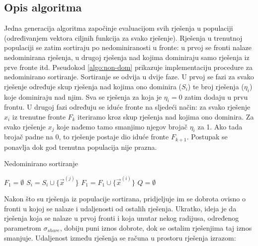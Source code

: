 \documentclass[times, utf8, zavrsni, numeric]{fer}
\begin{document}
\subsection{Opis algoritma}
Jedna generacija algoritma započinje evaluacijom svih rješenja u populaciji (određivanjem vektora ciljnih funkcija za svako rješenje). Rješenja u trenutnoj populaciji se zatim sortiraju po nedominiranosti u fronte: u prvoj se fronti nalaze nedominirana rješenja, u drugoj rješenja nad kojima dominiraju samo rješenja iz prve fronte itd. Pseudokod \ref{algo:non-dom} prikazuje implementaciju procedure za nedominirano sortiranje. Sortiranje se odvija u dvije faze. U prvoj se fazi za svako rješenje određuje skup rješenja nad kojima ono dominira ($S_i$) te broj rješenja ($\eta_i$) koje dominiraju nad njim. Sva se rješenja za koja je $\eta_i = 0$ zatim dodaju u prvu frontu. U drugoj fazi određuju se iduće fronte na sljedeći način: za svako rješenje $x_i$ iz trenutne fronte $F_k$ iteriramo kroz skup rješenja nad kojima ono dominira. Za svako rješenje $x_j$ koje nađemo tamo smanjimo njegov brojač $\eta_i$ za 1. Ako tada brojač padne na 0, to rješenje postaje dio iduće fronte $F_{k+1}$. Postupak se ponavlja dok god trenutna populacija nije prazna.\\
\begin{algorithm}
\caption{Nedominirano sortiranje}
\label{algo:non-dom}
\begin{algorithmic}
\STATE $F_1 = \emptyset$
\STATE $S_i = S_i \cup \{\vec{x}^{(j)}\}$
\ENDIF
\ENDFOR
{}
\STATE $F_1 = F_1 \cup \{\vec{x}^{(i)}\}$
\ENDIF
\ENDFOR
{}
\STATE $Q = \emptyset$
\ENDIF
\ENDFOR
\ENDFOR
{}
\ENDWHILE
\end{algorithmic}
\end{algorithm}
Nakon što su rješenja iz populacije sortirana, pridjeljuje im se dobrota ovisno o fronti u kojoj se nalaze i udaljenosti od ostalih rješenja. Ukratko, ideja je da rješenja koja se nalaze u prvoj fronti i koja unutar nekog radijusa, određenog parametrom $\sigma_{share}$, dobiju puni iznos dobrote, dok se ostalim rješenjima taj iznos smanjuje. Udaljenost između rješenja se računa u prostoru rješenja izrazom:
\end{document}
